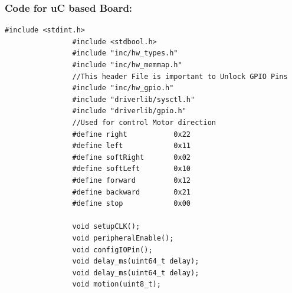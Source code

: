 \documentclass[a4paper,12pt,oneside]{article}
\begin{document}
			\subsubsection{\textbf{Code for uC based Board:}}
			\begin{lstlisting}[style=CStyle]
				#include <stdint.h>
				#include <stdbool.h>
				#include "inc/hw_types.h"
				#include "inc/hw_memmap.h"
				//This header File is important to Unlock GPIO Pins
				#include "inc/hw_gpio.h"
				#include "driverlib/sysctl.h"
				#include "driverlib/gpio.h"	
				//Used for control Motor direction
				#define right           0x22
				#define left            0x11
				#define softRight       0x02
				#define softLeft        0x10
				#define forward         0x12
				#define backward        0x21
				#define stop            0x00
			
				void setupCLK();
				void peripheralEnable();
				void configIOPin();
				void delay_ms(uint64_t delay);
				void delay_ms(uint64_t delay);
				void motion(uint8_t);
				

\end{lstlisting}
\end{document}
